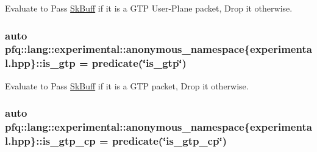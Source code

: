Evaluate to {\ttfamily Pass} \hyperlink{structpfq_1_1lang_1_1SkBuff}{Sk\+Buff} if it is a G\+TP User-\/\+Plane packet, {\ttfamily Drop} it otherwise. 

\subsubsection[{\texorpdfstring{is\+\_\+gtp}{is_gtp}}]{\setlength{\rightskip}{0pt plus 5cm}auto pfq\+::lang\+::experimental\+::anonymous\+\_\+namespace\{experimental.\+hpp\}\+::is\+\_\+gtp = {\bf predicate}(\char`\"{}is\+\_\+gtp\char`\"{})}\hypertarget{namespacepfq_1_1lang_1_1experimental_1_1anonymous__namespace_02experimental_8hpp_03_a2eb9e54a6fc6170b246cf3149445a2c4}{}\label{namespacepfq_1_1lang_1_1experimental_1_1anonymous__namespace_02experimental_8hpp_03_a2eb9e54a6fc6170b246cf3149445a2c4}


Evaluate to {\ttfamily Pass} \hyperlink{structpfq_1_1lang_1_1SkBuff}{Sk\+Buff} if it is a G\+TP packet, {\ttfamily Drop} it otherwise. 

\subsubsection[{\texorpdfstring{is\+\_\+gtp\+\_\+cp}{is_gtp_cp}}]{\setlength{\rightskip}{0pt plus 5cm}auto pfq\+::lang\+::experimental\+::anonymous\+\_\+namespace\{experimental.\+hpp\}\+::is\+\_\+gtp\+\_\+cp = {\bf predicate}(\char`\"{}is\+\_\+gtp\+\_\+cp\char`\"{})}\hypertarget{namespacepfq_1_1lang_1_1experimental_1_1anonymous__namespace_02experimental_8hpp_03_ade25d79513e3131a54a05e23d25a7539}{}\label{namespacepfq_1_1lang_1_1experimental_1_1anonymous__namespace_02experimental_8hpp_03_ade25d79513e3131a54a05e23d25a7539}



